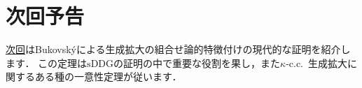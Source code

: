 \documentclass[a4j,leqno]{ltjsarticle}
\newcommand{\sDDG}{\mathord{\mathrm{sDDG}}}
\begin{document}
\section*{次回予告}
\href{https://konn-san.com/math/geology-bukovsky-theorem.html}{次回}はBukovsk\'{y}による生成拡大の組合せ論的特徴付けの現代的な証明を紹介します．
この定理は$\sDDG$の証明の中で重要な役割を果し，また$\kappa$-c.c.\ 生成拡大に関するある種の一意性定理が従います．

\nocite{Fuchs:2014fj,Usuba:2017fp,Reitz:2007af}
\nocite{Friedman:2016lr,Hamkins:2015uq}
\printbibliography[title=参考文献]
\end{document}
